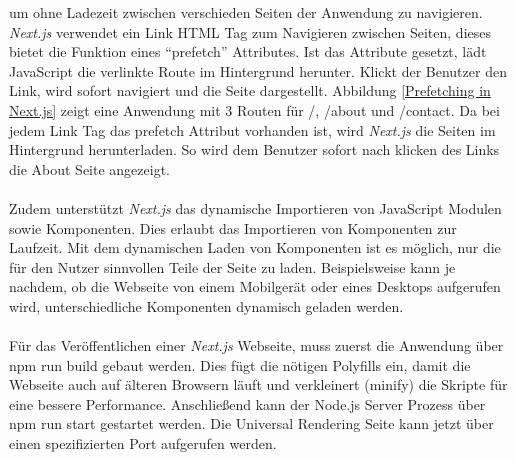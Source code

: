 \documentclass[runningheads]{llncs}
\numberwithin{figure}{section}
\begin{document}
um ohne Ladezeit zwischen verschieden Seiten der Anwendung zu navigieren. 
\textit{Next.js} verwendet ein Link HTML Tag zum Navigieren zwischen Seiten, 
dieses bietet die Funktion eines “prefetch” Attributes. 
Ist das Attribute gesetzt, 
lädt JavaScript die verlinkte Route im Hintergrund herunter. 
Klickt der Benutzer den Link, 
wird sofort navigiert und die Seite dargestellt. 
Abbildung \ref{Prefetching in Next.js} zeigt eine Anwendung mit 3 Routen für /, /about und /contact. 
Da bei jedem Link Tag das prefetch Attribut vorhanden ist, 
wird \textit{Next.js} die Seiten im Hintergrund herunterladen. 
So wird dem Benutzer sofort nach klicken des Links die About Seite angezeigt.
\\
\\
Zudem unterstützt \textit{Next.js} das dynamische Importieren von JavaScript Modulen sowie Komponenten. 
Dies erlaubt das Importieren von Komponenten zur Laufzeit. 
Mit dem dynamischen Laden von Komponenten ist es möglich, 
nur die für den Nutzer sinnvollen Teile der Seite zu laden. 
Beispielsweise kann je nachdem, 
ob die Webseite von einem Mobilgerät oder eines Desktops aufgerufen wird, 
unterschiedliche Komponenten dynamisch geladen werden. 
\\
\\
Für das Veröffentlichen einer \textit{Next.js} Webseite, 
muss zuerst die Anwendung über npm run build gebaut werden. 
Dies fügt die nötigen Polyfills ein, 
damit die Webseite auch auf älteren Browsern läuft und 
verkleinert (minify) die Skripte für eine bessere Performance. 
Anschließend kann der Node.js Server Prozess über npm run start gestartet werden. 
Die Universal Rendering Seite kann jetzt über einen spezifizierten Port aufgerufen werden. \cite{arunoda} \cite{AlexMoldovan-siderenderinginReact}
\end{document}
